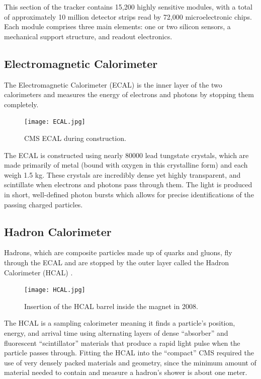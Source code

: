 This section of the tracker contains 15,200 highly sensitive modules, with a total of approximately 10 million detector strips read by 72,000 microelectronic chips. Each module comprises three main elements: one or two silicon sensors, a mechanical support structure, and readout electronics.

\subsection{Electromagnetic Calorimeter}

The Electromagnetic Calorimeter (ECAL) is the inner layer of the two calorimeters and measures the energy of electrons and photons by stopping them completely. 

\begin{figure}[!htb]
    \begin{center}
        \texttt{[image: ECAL.jpg]}
        \caption{CMS ECAL during construction.}
        \label{fig:ECAL}
    \end{center}
\end{figure}

The ECAL is constructed using nearly 80000 lead tungstate crystals, which are made primarily of metal (bound with oxygen in this crystalline form) and each weigh 1.5 kg. These crystals are incredibly dense yet highly transparent, and scintillate when electrons and photons pass through them. The light is produced in short, well-defined photon bursts which allows for precise identifications of the passing charged particles.

\subsection{Hadron Calorimeter}

Hadrons, which are composite particles made up of quarks and gluons, fly through the ECAL and are stopped by the outer layer called the Hadron Calorimeter (HCAL) \cite{CERN-LHCC-97-031}.

\begin{figure}[!htb]
    \begin{center}
        \texttt{[image: HCAL.jpg]}
        \caption{Insertion of the HCAL barrel inside the magnet in 2008.}
        \label{fig:HCAL}
    \end{center}
\end{figure}

The HCAL is a sampling calorimeter meaning it finds a particle’s position, energy, and arrival time using alternating layers of dense ``absorber'' and fluorescent ``scintillator'' materials that produce a rapid light pulse when the particle passes through. Fitting the HCAL into the ``compact'' CMS required the use of very densely packed materials and geometry, since the minimum amount of material needed to contain and measure a hadron's shower is about one meter. 

